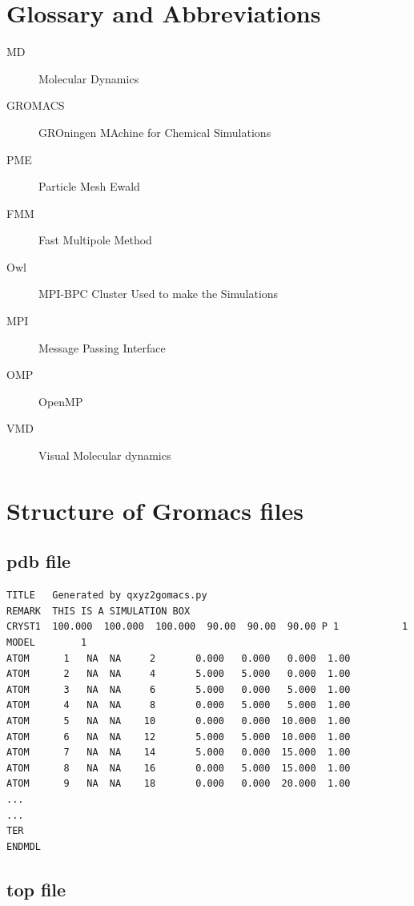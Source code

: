 \documentclass[11pt,twoside,a4paper]{report}
\begin{document}
\begin{appendices}
\chapter{Glossary and Abbreviations}

\begin{description}


\item[MD]  Molecular Dynamics
\item[GROMACS] GROningen MAchine for Chemical Simulations
\item[PME] Particle Mesh Ewald
\item[FMM] Fast Multipole Method
\item[Owl] MPI-BPC Cluster Used to make the Simulations

\item[MPI] Message Passing Interface
\item[OMP] OpenMP
\item[VMD] Visual Molecular dynamics


\end{description}


\chapter{Structure of Gromacs files}

\section{pdb file}

\begin{verbatim}
TITLE	Generated by qxyz2gomacs.py
REMARK	THIS IS A SIMULATION BOX
CRYST1  100.000  100.000  100.000  90.00  90.00  90.00 P 1           1
MODEL        1
ATOM      1   NA  NA     2       0.000   0.000   0.000  1.00
ATOM      2   NA  NA     4       5.000   5.000   0.000  1.00
ATOM      3   NA  NA     6       5.000   0.000   5.000  1.00
ATOM      4   NA  NA     8       0.000   5.000   5.000  1.00
ATOM      5   NA  NA    10       0.000   0.000  10.000  1.00
ATOM      6   NA  NA    12       5.000   5.000  10.000  1.00
ATOM      7   NA  NA    14       5.000   0.000  15.000  1.00
ATOM      8   NA  NA    16       0.000   5.000  15.000  1.00
ATOM      9   NA  NA    18       0.000   0.000  20.000  1.00
...
...
TER
ENDMDL
\end{verbatim}

\section{top file}



\end{appendices}
\end{document}
